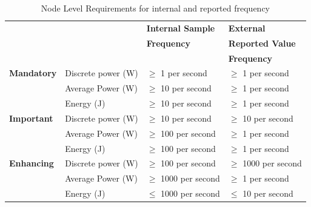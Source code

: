 \begin{table}
\caption{Node Level Requirements for internal and reported frequency}
\label{tab:nodelevel}
\begin{tabular}{|p{3.0cm}|p{3.5cm}|p{3.5cm}|p{3.5cm}|} \hline
& & \textbf{Internal Sample}&\textbf{External}\\ 
& & \textbf{Frequency}&\textbf{Reported Value}\\ 
& & & \textbf{Frequency}\\ \hline

\textbf{Mandatory} &
Discrete power (W)&
\mbox{$ \ge $} 1 per second &
\mbox{$ \ge $} 1 per second \\

& 
Average Power (W) &
\mbox{$ \ge $} 10 per second &
\mbox{$ \ge $} 1 per second \\

& 
Energy (J) &
\mbox{$ \ge $} 10 per second &
\mbox{$ \ge $} 1 per second \\ \hline

\textbf{Important} & 
Discrete power (W)&
\mbox{$ \ge $} 10 per second &
\mbox{$ \ge $} 10 per second \\

& 
Average Power (W) &
\mbox{$ \ge $} 100 per second &
\mbox{$ \ge $} 1 per second \\

& 
Energy (J) &
\mbox{$ \ge $} 100 per second &
\mbox{$ \ge $} 1 per second \\ \hline 

\textbf{Enhancing} & 
Discrete power (W)&
\mbox{$ \ge $} 100 per second &
\mbox{$ \ge $} 1000 per second \\

& 
Average Power (W) &
\mbox{$ \ge $} 1000 per second &
\mbox{$ \ge $} 1 per second \\

& 
Energy (J) &
\mbox{$ \le $} 1000 per second &
\mbox{$ \le $} 10 per second \\ \hline

\end{tabular}
\end{table}

